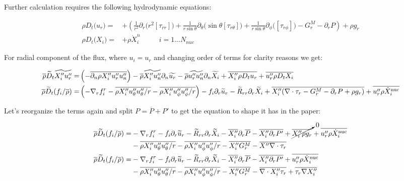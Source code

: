 \documentclass[10pt,paper=a4]{report}
\newcommand{\eht}{\overline}
\newcommand{\fht}{\widetilde}
\newcommand{\fav}{\widetilde}
\def\erho{\eht{\rho}}
\begin{document}
\noindent
Further calculation requires the following hydrodynamic equations:

\begin{align}
\rho D_{t} \big(u_{r}\big) = & +\left( \frac{1}{r^{2}} \partial_{r} \big( r^{2} [\tau_{rr}]\big) + \frac{1}{r\sin{\theta}}\partial_{\theta}(\sin{\theta}[\tau_{r\theta}]\big) + \frac{1}{r\sin{\theta}}\partial_{\phi}\big([\tau_{r\phi}]\big) - G_r^M - \partial_{r} P \right) + \rho g_r \\
\rho D_{t} \big(X_{i}\big) = & + \rho \dot{X}_{i}^{n} \ \ \ \ \ \ \ \ \ \ \ \  i = 1 ... N_{nuc}
\end{align}

\noindent
For radial component of the flux, where $u_i = u_r$ and changing order of terms for clarity reasons we get:

\begin{align}
\overline{\rho}\widetilde{D}_t \widetilde{X''_i u''_r} = & \left(- \overline{\partial_n \rho X''_i u''_r u''_n} \right) - \overline{\rho} \widetilde{X''_i u''_n}\partial_n \widetilde{u_r}  - \overline{\rho} \widetilde{u''_r u''_n}\partial_n \widetilde{X_i} + \overline{X''_i \rho D_t u_r} + \overline{u''_r \rho D_t X_i}  \\
\erho \fav{D}_t (f_i / \eht{\rho}) = &  \left( -\nabla_r f_i^r -\eht{\rho X''_i u''_\theta u''_\theta/r} - \eht{\rho X''_i u''_\phi u''_\phi/r} \right) - f_i \partial_r \fht{u}_r - \fht{R}_{rr} \partial_r \fht{X}_i + \eht{X''_{i}(\nabla \cdot \tau_r  - G_r^M - \partial_{r} P + \rho g_r)} + \eht{u''_r \rho  \dot{X}_i^{\rm nuc}}
\end{align}

\noindent
Let's reorganize the terms again and split  $P = \overline{P} + P'$ to get the equation to shape it has in the paper:


\begin{align}
\erho \fav{D}_t (f_i / \eht{\rho}) = &  -\nabla_r f_i^r  - f_i \partial_r \fht{u}_r - \fht{R}_{rr} \partial_r \fht{X}_i -\eht{X''_i} \partial_r \eht{P} - \eht{X''_i \partial_r P'} + \cancelto{0}{\eht{X''_i \rho g_r }} + \overline{u''_r \rho \dot{X}_i^{\rm nuc}} \\
& -\eht{\rho X''_i u''_\theta u''_\theta/r} - \eht{\rho X''_i u''_\phi u''_\phi/r}  - \eht{X''_i G_r^M} - \eht{X'' \nabla \cdot \tau_r}  \\
\erho \fav{D}_t (f_i / \eht{\rho}) = &  -\nabla_r f_i^r  - f_i \partial_r \fht{u}_r - \fht{R}_{rr} \partial_r \fht{X}_i -\eht{X''_i} \partial_r \eht{P} - \eht{X''_i \partial_r P'} + \overline{u''_r \rho \dot{X}_i^{\rm nuc}} \\
& -\eht{\rho X''_i u''_\theta u''_\theta/r} - \eht{\rho X''_i u''_\phi u''_\phi/r}  - \eht{X''_i G_r^M} - \eht{\nabla \cdot X''_i \tau_r} + \eht{\tau_r \nabla X''_i}  \\
\end{align}
\end{document}
